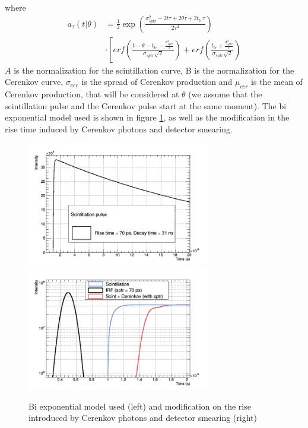 where 
\begin{equation}
\begin{align*}
a _{\tau}(t|\theta) &= \frac{1}{2} \exp{\left(\frac{\sigma _{sptr} ^{2} - 2t\tau +2\theta \tau + 2t_{tr}\tau}{2\tau ^{2}}\right)} \\
& \cdot \left[ erf\left( \frac{t-\theta -t_{tr} - \frac{\sigma ^{2}_{sptr}}{\tau}}{\sigma _{sptr}\sqrt{2}} \right) + erf \left( \frac{t_{tr}+\frac{\sigma ^{2} _{sptr}}{\tau}}{\sigma _{sptr}\sqrt{2}} \right)
\end{align*}
\end{equation}
$A$ is the normalization for the scintillation curve, B is the normalization for the Cerenkov curve, $\sigma _{cer}$ is the spread of Cerenkov production and $\mu _{cer}$ is the mean of Cerenkov production, that will be considered at $\theta$ (we assume that the scintillation pulse and the Cerenkov pulse start at the same moment).
The bi exponential model used is shown in figure \ref{fig:models}, as well as the modification in the rise time induced by Cerenkov photons and detector smearing.
\begin{figure}[htbp]
\begin{center}
\includegraphics[width=8cm]{../Pictures/Chapter_4/scint_new.png}
\includegraphics[width=8cm]{../Pictures/Chapter_4/tot_new.png}
\end{center}
\caption[Model functions]{Bi exponential model used (left) and modification on the rise introduced by Cerenkov photons and detector smearing (right)}
\label{fig:models}
\end{figure}

